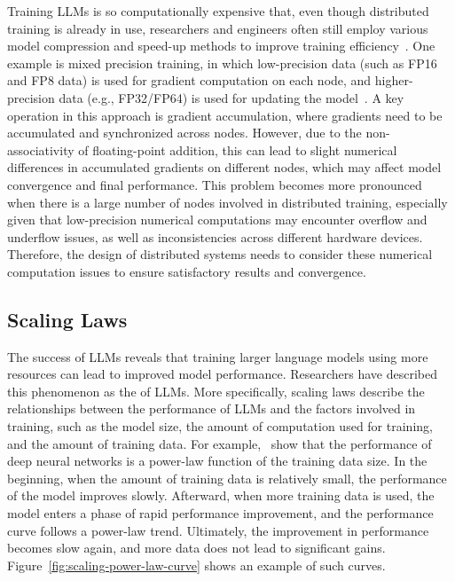 Training LLMs is so computationally expensive that, even though distributed training is already in use, researchers and engineers often still employ various model compression and speed-up methods to improve training efficiency~\cite{weng:2021large}. One example is mixed precision training, in which low-precision data (such as FP16 and FP8 data) is used for gradient computation on each node, and higher-precision data (e.g., FP32/FP64) is used for updating the model~\cite{micikevicius-etal:2018mixed}. A key operation in this approach is gradient accumulation, where gradients need to be accumulated and synchronized across nodes. However, due to the non-associativity of floating-point addition, this can lead to slight numerical differences in accumulated gradients on different nodes, which may affect model convergence and final performance. This problem becomes more pronounced when there is a large number of nodes involved in distributed training, especially given that low-precision numerical computations may encounter overflow and underflow issues, as well as inconsistencies across different hardware devices. Therefore, the design of distributed systems needs to consider these numerical computation issues to ensure satisfactory results and convergence.

\subsection{Scaling Laws}

\noindent The success of LLMs reveals that training larger language models using more resources can lead to improved model performance. Researchers have described this phenomenon as the  of LLMs. More specifically, scaling laws describe the relationships between the performance of LLMs and the factors involved in training, such as the model size, the amount of computation used for training, and the amount of training data. For example,~\citet{hestness-etal:2017deep} show that the performance of deep neural networks is a power-law function of the training data size. In the beginning, when the amount of training data is relatively small, the performance of the model improves slowly. Afterward, when more training data is used, the model enters a phase of rapid performance improvement, and the performance curve follows a power-law trend. Ultimately, the improvement in performance becomes slow again, and more data does not lead to significant gains. Figure~\ref{fig:scaling-power-law-curve} shows an example of such curves.

